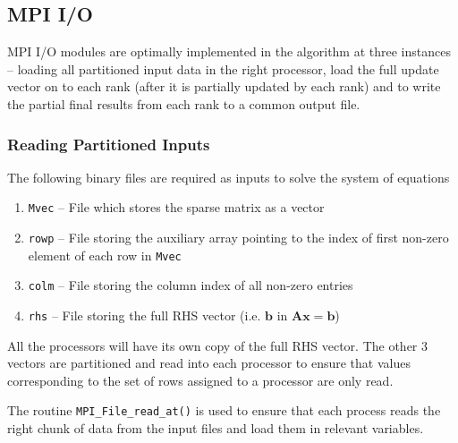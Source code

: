 \documentclass[sigplan,screen]{acmart}
\begin{document}
\subsection{MPI I/O}
MPI I/O modules are optimally implemented in the algorithm at three instances -- loading all partitioned input data in the right processor, load the full update vector on to each rank (after it is partially updated by each rank) and to write the partial final results from each rank to a common output file.

\subsubsection{Reading Partitioned Inputs}
The following binary files are required as inputs to solve the system of equations
\begin{enumerate}
	\item \texttt{Mvec} -- File which stores the sparse matrix as a vector
	\item \texttt{rowp} -- File storing the auxiliary array pointing to the index of first non-zero element of each row in \texttt{Mvec}
	\item \texttt{colm} -- File storing the column index of all non-zero entries
	\item \texttt{rhs} -- File storing the full RHS vector (i.e. $\mathbf{b}$ in $\mathbf{A}\mathbf{x}=\mathbf{b}$)
\end{enumerate} 

All the processors will have its own copy of the full RHS vector. The other 3 vectors are partitioned and read into each processor to ensure that values corresponding to the set of rows assigned to a processor are only read. 

The routine \texttt{MPI\_File\_read\_at()} is used to ensure that each process reads the right chunk of data from the input files and load them in relevant variables.
\end{document}
